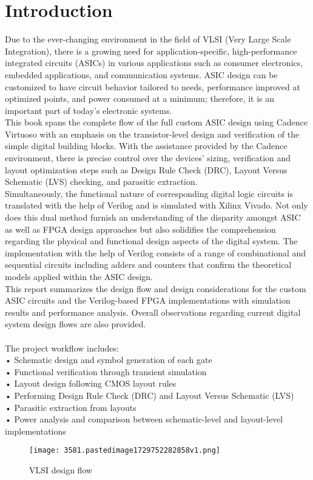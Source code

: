 \documentclass[12pt]{article}
\begin{document}
\section{Introduction}
\label{int}
Due to the ever-changing environment in the field of VLSI (Very Large Scale Integration), there is a growing need for application-specific, high-performance integrated circuits (ASICs) in various applications such as consumer electronics, embedded applications, and communication systems. ASIC design can be customized to have circuit behavior tailored to needs, performance improved at optimized points, and power consumed at a minimum; therefore, it is an important part of today's electronic systems.\\
This book spans the complete flow of the full custom ASIC design using Cadence Virtuoso with an emphasis on the transistor-level design and verification of the simple digital building blocks. With the assistance provided by the Cadence environment, there is precise control over the devices' sizing, verification and layout optimization steps such as Design Rule Check (DRC), Layout Versus Schematic (LVS) checking, and parasitic extraction.\\
Simultaneously, the functional nature of corresponding digital logic circuits is translated with the help of Verilog and is simulated with Xilinx Vivado. Not only does this dual method furnish an understanding of the disparity amongst ASIC as well as FPGA design approaches but also solidifies the comprehension regarding the physical and functional design aspects of the digital system. The implementation with the help of Verilog consists of a range of combinational and sequential circuits including adders and counters that confirm the theoretical models applied within the ASIC design.\\
This report summarizes the design flow and design considerations for the custom ASIC circuits and the Verilog-based FPGA implementations with simulation results and performance analysis. Overall observations regarding current digital system design flows are also provided.
\\
\\
The project workflow includes:\\
•	Schematic design and symbol generation of each gate\\
•	Functional verification through transient simulation\\
•	Layout design following CMOS layout rules\\
•	Performing Design Rule Check (DRC) and Layout Versus Schematic (LVS)\\
•	Parasitic extraction from layouts\\
•	Power analysis and comparison between schematic-level and layout-level implementations
\begin{figure}[h!]
    \centering
    \texttt{[image: 3581.pastedimage1729752282858v1.png]}
    \caption{VLSI design flow}
    \label{fig:vlsi-design-flow}
\end{figure}
\end{document}
